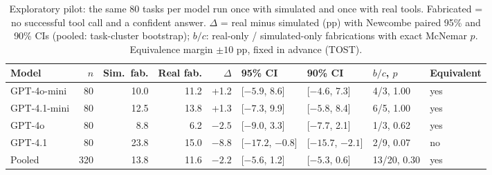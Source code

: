 \begin{table}[!tbp]
\centering
\caption{Exploratory pilot: the same 80 tasks per model run once with simulated and once with real tools. Fabricated = no successful tool call and a confident answer. $\Delta$ = real minus simulated (pp) with Newcombe paired 95\% and 90\% CIs (pooled: task-cluster bootstrap); $b/c$: real-only / simulated-only fabrications with exact McNemar $p$. Equivalence margin $\pm10$ pp, fixed in advance (TOST).}
\label{tab:pilot}
\footnotesize
\setlength{\tabcolsep}{3.5pt}
\begin{tabular}{@{}lrrrrllll@{}}
\toprule
Model & $n$ & Sim.\ fab. & Real fab. & $\Delta$ & 95\% CI & 90\% CI & $b/c$, $p$ & Equivalent \\
\midrule
GPT-4o-mini & 80 & 10.0 & 11.2 & +1.2 & [$-5.9$, 8.6] & [$-4.6$, 7.3] & 4/3, 1.00 & yes \\
GPT-4.1-mini & 80 & 12.5 & 13.8 & +1.3 & [$-7.3$, 9.9] & [$-5.8$, 8.4] & 6/5, 1.00 & yes \\
GPT-4o & 80 & 8.8 & 6.2 & $-2.5$ & [$-9.0$, 3.3] & [$-7.7$, 2.1] & 1/3, 0.62 & yes \\
GPT-4.1 & 80 & 23.8 & 15.0 & $-8.8$ & [$-17.2$, $-0.8$] & [$-15.7$, $-2.1$] & 2/9, 0.07 & no \\
\midrule
Pooled & 320 & 13.8 & 11.6 & $-2.2$ & [$-5.6$, 1.2] & [$-5.3$, 0.6] & 13/20, 0.30 & yes \\
\bottomrule
\end{tabular}
\end{table}
